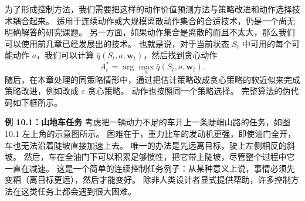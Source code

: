 \documentclass[UTF8, 12pt, fontset=fandol, oneside]{ctexart}
\begin{document}
为了形成控制方法，我们需要把这样的动作价值预测方法与策略改进和动作选择技术耦合起来。
适用于连续动作或大规模离散动作集合的合适技术，仍是一个尚无明确解答的研究课题。
另一方面，如果动作集合是离散的而且不太大，那么我们可以使用前几章已经发展出的技术。
也就是说，对于当前状态 $S_t$ 中可用的每个可能动作 $a$，我们可以计算 $\hat q(S_t,a,\mathbf{w}_t)$，然后找到贪心动作
\[
A_t^*=\arg\max_a\hat q(S_t,a,\mathbf{w}_t).
\]
随后，在本章处理的同策略情形中，通过把估计策略改成贪心策略的软近似来完成策略改进，例如改成 $\varepsilon$-贪心策略。
动作也按照同一个策略选择。
完整算法的伪代码如下框所示。

\begin{center}
\end{center}

\noindent\textbf{例 10.1：山地车任务}
考虑把一辆动力不足的车开上一条陡峭山路的任务，如图 10.1 左上角的示意图所示。
困难在于，重力比车的发动机更强，即使油门全开，车也无法沿着陡坡直接加速上去。
唯一的办法是先远离目标，驶上左侧相反的斜坡。
然后，车在全油门下可以积累足够惯性，把它带上陡坡，尽管整个过程中它一直在减速。
这是一个简单的连续控制任务例子：从某种意义上说，事情必须先变糟（离目标更远），然后才能变好。
除非人类设计者显式提供帮助，许多控制方法在这类任务上都会遇到很大困难。
\end{document}
